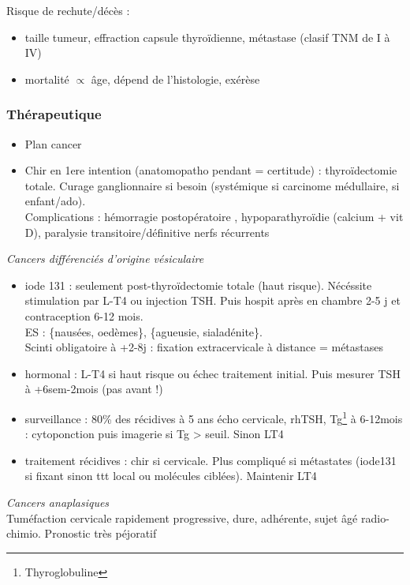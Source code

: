 \documentclass[11pt]{article}
\begin{document}
Risque de rechute/décès : 
\begin{itemize}
\item taille tumeur, effraction capsule thyroïdienne, métastase (clasif TNM de I à IV)
\item mortalité \(\propto\) âge, dépend de l'histologie, exérèse
\end{itemize}

\subsubsection{Thérapeutique}
\label{sec:orgb7ca9ff}
\begin{itemize}
\item Plan cancer
\item Chir en 1ere intention (anatomopatho pendant = certitude) : thyroïdectomie
totale. Curage ganglionnaire si besoin (systémique si carcinome médullaire,
si enfant/ado). \\
Complications : hémorragie postopératoire \skull,  hypoparathyroïdie (calcium + vit D), paralysie transitoire/définitive nerfs récurrents
\end{itemize}
\vspace*{10pt}

\emph{Cancers différenciés d'origine vésiculaire}
\begin{itemize}
\item iode 131 : seulement post-thyroïdectomie totale (haut risque). Nécéssite
stimulation par L-T4 ou injection TSH. Puis hospit après en chambre 2-5 j
et contraception 6-12 mois. \\
ES : \{nausées, oedèmes\}, \{agueusie, sialadénite\}. \\
Scinti  obligatoire à +2-8j : fixation extracervicale à  distance = métastases
\item hormonal : L-T4 si haut risque ou échec traitement initial. Puis mesurer TSH à
+6sem-2mois (pas avant !)
\item surveillance : 80\% des récidives à 5 ans \thus écho cervicale, rhTSH,
Tg\footnote{Thyroglobuline} à 6-12mois : cytoponction puis imagerie si Tg > seuil. Sinon \dec LT4
\item traitement récidives : chir si cervicale. Plus compliqué si métastates
(iode131 si fixant sinon ttt local ou molécules ciblées). Maintenir LT4
\end{itemize}

\emph{Cancers anaplasiques}\\
Tuméfaction cervicale rapidement progressive, dure, adhérente, sujet âgé \thus radio-chimio. Pronostic très péjoratif
\end{document}

